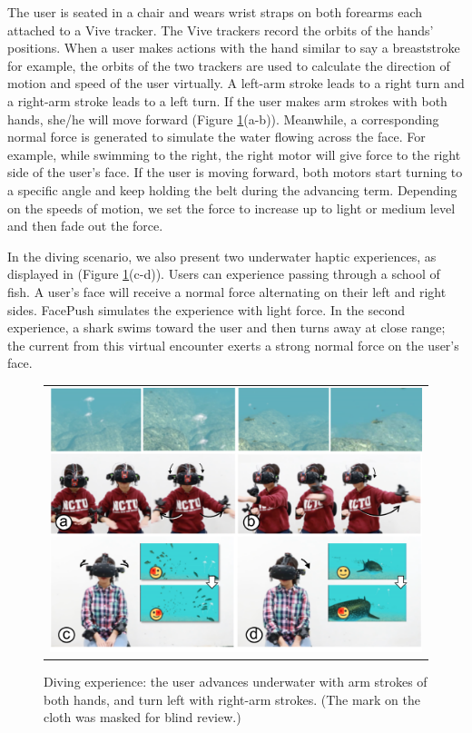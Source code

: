 The user is seated in a chair and wears wrist straps on both forearms each attached to a Vive tracker. The Vive trackers record the orbits of the hands' positions. When a user makes actions with the hand similar to say a breaststroke for example, the orbits of the two trackers are used to calculate the direction of motion and speed of the user virtually. A left-arm stroke leads to a right turn and a right-arm stroke leads to a left turn. If the user makes arm strokes with both hands, she/he will move forward (Figure \ref{fig:diving-fishshark}(a-b)). Meanwhile, a corresponding normal force is generated to simulate the water flowing across the face. For example, while swimming to the right, the right motor will give force to the right side of the user's face. If the user is moving forward, both motors start turning to a specific angle and keep holding the belt during the advancing term. Depending on the speeds of motion, we set the force to increase up to light or medium level and then fade out the force.

In the diving scenario, we also present two underwater haptic experiences, as displayed in (Figure \ref{fig:diving-fishshark}(c-d)). Users can experience passing through a school of fish.
A user's face will receive a normal force alternating on their left and right sides. FacePush simulates the experience with light force. In the second experience, a shark swims toward the user and then turns away at close range; the current from this virtual encounter exerts a strong normal force on the user's face.

\begin{figure}[h]
    \begin{center}
        \begin{tabular}{@{\hspace{0.1cm}}c}
            \includegraphics[width=1\linewidth]{figures/diving-fishshark2}
        \end{tabular}
        \caption{Diving experience: the user advances underwater with arm strokes of both hands, and turn left with right-arm strokes.  (The mark on the cloth was masked for blind review.)}
        \label{fig:diving-fishshark}
    \end{center}
\end{figure}

